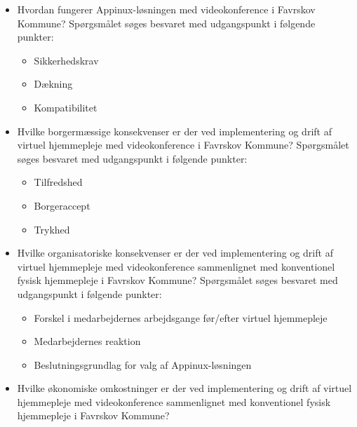 \begin{itemize}
	\item Hvordan fungerer Appinux-løsningen med videokonference i Favrskov Kommune? Spørgsmålet søges besvaret med udgangspunkt i følgende punkter:
	\begin{itemize}
	\item Sikkerhedskrav
	\item Dækning %
	\item Kompatibilitet 
\end{itemize}
\end{itemize}

\begin{itemize}
	\item Hvilke borgermæssige konsekvenser er der ved implementering og drift af virtuel hjemmepleje med videokonference i Favrskov Kommune? Spørgsmålet søges besvaret med udgangspunkt i følgende punkter:
	\begin{itemize}
	\item Tilfredshed
	\item Borgeraccept
	\item Trykhed
\end{itemize}
\end{itemize}

\begin{itemize}
	\item Hvilke organisatoriske konsekvenser er der ved implementering og drift af virtuel hjemmepleje med videokonference sammenlignet med konventionel fysisk hjemmepleje i Favrskov Kommune? Spørgsmålet søges besvaret med udgangspunkt i følgende punkter:
	\begin{itemize}
	\item Forskel i medarbejdernes arbejdsgange før/efter virtuel hjemmepleje
	\item Medarbejdernes reaktion
	\item Beslutningsgrundlag for valg af Appinux-løsningen 
\end{itemize}
\end{itemize}


\begin{itemize}
	\item Hvilke økonomiske omkostninger er der ved implementering og drift af virtuel hjemmepleje med videokonference sammenlignet med konventionel fysisk hjemmepleje i Favrskov Kommune?
\end{itemize}

